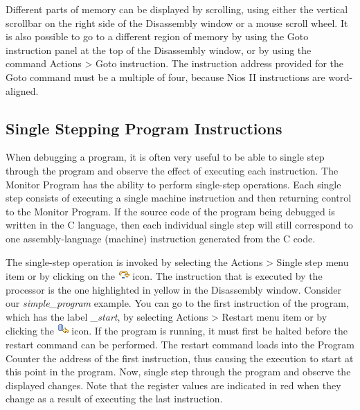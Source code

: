 \documentclass[11pt, twoside, pdftex]{article}
\begin{document}
Different parts of memory can be displayed by scrolling, 
using either the vertical scrollbar on the right side of the Disassembly window or a mouse scroll wheel.
It is also possible to go to a different region of memory by 
using the \textsf{Goto instruction} panel 
at the top of the Disassembly window, or by using the command \textsf{Actions > Goto instruction}.  The instruction address
provided for the {\sf Goto} command must be a multiple of four,
because Nios II instructions are word-aligned. 

\subsection{Single Stepping Program Instructions}

When debugging a program, it is often very useful to be able
to single step through the program and observe the effect of
executing each instruction. 
The Monitor Program has the ability to perform single-step
operations. Each single step consists of executing a single
machine instruction and then returning control to the Monitor
Program. If the source code of the program being debugged is
written in the C language, then each individual single step will
still correspond to one assembly-language (machine) instruction
generated from the C code. 

The single-step operation is invoked by selecting the
\textsf{Actions > Single step} menu item or by clicking on the \includegraphics{toolbar/singlestep.png} icon. The 
instruction that is executed by the processor is the
one highlighted in yellow in the \textsf{Disassembly} window.
Consider our {\it simple\_program} example. You can go to the
first instruction of the program, which has the label 
{\it \_start}, by selecting \textsf{Actions > Restart} 
menu item or by clicking  
the \includegraphics{toolbar/restart.png} icon. If the program is
running, it must first be halted before the restart 
command can be performed.
The restart command loads into the Program Counter the address of
the first instruction, thus causing the execution to start at
this point in the program.
Now, single step through the program and observe the displayed 
changes. Note that the register values are indicated in red when
they change as a result of executing the last instruction.
\end{document}
